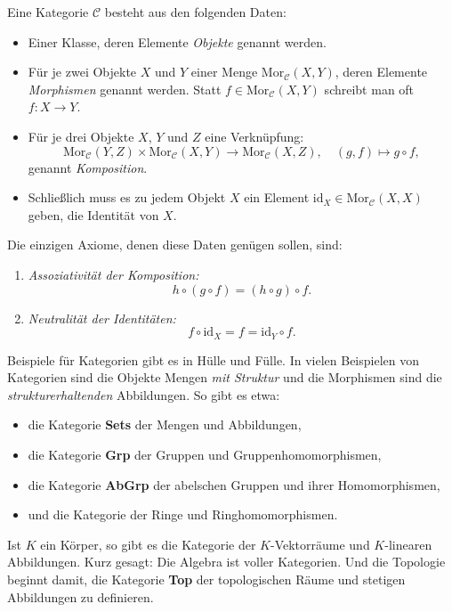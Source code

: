 \documentclass[
12pt, 
openany, 
a4paper, 
final,
fleqn, 
]{myclass}
\numberwithin{equation}{chapter}
\numberwithin{section}{chapter}
\begin{document}
\begin{defn}
Eine Kategorie \(\mathcal{C}\) besteht aus den folgenden Daten:
\begin{itemize}
\item Einer Klasse, deren Elemente \emph{Objekte} genannt werden.
\item Für je zwei Objekte \(X\) und \(Y\) einer Menge \(\text{Mor}_\mathcal{C}(X, Y)\), deren Elemente \emph{Morphismen} genannt werden. Statt \(f \in \text{Mor}_\mathcal{C}(X, Y)\) schreibt man oft \(f : X \to Y\).
\item Für je drei Objekte \(X\), \(Y\) und \(Z\) eine Verknüpfung:
\[
\text{Mor}_\mathcal{C}(Y, Z) \times \text{Mor}_\mathcal{C}(X, Y) \to \text{Mor}_\mathcal{C}(X, Z), \quad (g, f) \mapsto g \circ f,
\]
genannt \emph{Komposition}.
\item Schließlich muss es zu jedem Objekt \(X\) ein Element \(\text{id}_X \in \text{Mor}_\mathcal{C}(X, X)\) geben, die Identität von \(X\).
\end{itemize}

Die einzigen Axiome, denen diese Daten genügen sollen, sind:
\begin{enumerate}
\item \emph{Assoziativität der Komposition:}
\[
h \circ (g \circ f) = (h \circ g) \circ f.
\]
\item \emph{Neutralität der Identitäten:}
\[
f \circ \text{id}_X = f = \text{id}_Y \circ f.
\]
\end{enumerate}

\end{defn}
Beispiele für Kategorien gibt es in Hülle und Fülle. In vielen Beispielen von Kategorien sind die Objekte Mengen \emph{mit Struktur} und die Morphismen sind die \emph{strukturerhaltenden} Abbildungen. So gibt es etwa:
\begin{itemize}
\item die Kategorie \textbf{Sets} der Mengen und Abbildungen,
\item die Kategorie \textbf{Grp} der Gruppen und Gruppenhomomorphismen,
\item die Kategorie \textbf{AbGrp} der abelschen Gruppen und ihrer Homomorphismen,
\item und die Kategorie der Ringe und Ringhomomorphismen.
\end{itemize}

Ist \(K\) ein Körper, so gibt es die Kategorie der \(K\)-Vektorräume und \(K\)-linearen Abbildungen. Kurz gesagt: Die Algebra ist voller Kategorien. Und die Topologie beginnt damit, die Kategorie \textbf{Top} der topologischen Räume und stetigen Abbildungen zu definieren.
\end{document}
